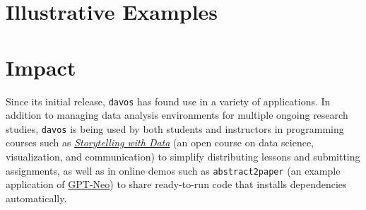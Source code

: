\documentclass[preprint,12pt, a4paper]{elsarticle}
\newcommand{\comment}[1]{}
\begin{document}
\section{Illustrative Examples}



\section{Impact}
\comment{
- emphasize research domain-independent application (Journal's goals/values page says they prioritize this in submissions)
- applicability not limited to research
    - regression (?) testing
    - ***^^not sure this should be included -- hurts framing of davos as "research software"***
- makes writing and running publicly available reproducible code more accessible (lowers required software comfort/familiarity level \& computing resources vs. installing docker/singularity/conda)
    - also removes these requirements from other scenarios, e.g., easier for new/less experienced students/RAs to get involved with analyses
- mention something about not having to teach environment management to teach day 1 python lesson, or spend hours debugging conda installation in order to share tutorial or demo with students
    - e.g., "researchers who teach \_\_\_ may be familiar with the experience of running a lesson or workshop that requires students to use Docker (or similar...) to run their code, only to spend the majority of class time debugging students' computing environments rather than teaching the lesson itself."
}

Since its initial release, \texttt{davos} has found use in a variety
of applications.  In addition to managing data analysis environments
for multiple ongoing research studies, \texttt{davos} is being used by
both students and instructors in programming courses such as
\href{https://github.com/ContextLab/storytelling-with-data}{\textit{Storytelling
    with Data}} \cite{Mann21b} (an open course on data science,
visualization, and communication) to simplify distributing lessons and
submitting assignments, as well as in online demos such as
{\texttt{abstract2paper}} \cite{Mann21a} (an example application of
\href{https://github.com/EleutherAI/gpt-neo}{GPT-Neo}) to share
ready-to-run code that installs dependencies automatically.
\end{document}

